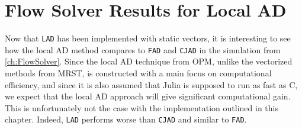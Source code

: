 \section{Flow Solver Results for Local AD}
\label{sec:flowSolverWithLAD}
Now that \texttt{LAD} has been implemented with static vectors, it is interesting to see how the local AD method compares to \texttt{FAD} and \texttt{CJAD} in the simulation from \autoref{ch:FlowSolver}. Since the local AD technique from OPM, unlike the vectorized methods from MRST, is constructed with a main focus on computational efficiency, and since it is also assumed that Julia is supposed to run as fast as C, we expect that the local AD approach will give significant computational gain. This is unfortunately not the case with the implementation outlined in this chapter. Indeed, \texttt{LAD} performs worse than \texttt{CJAD} and similar to \texttt{FAD}. 

